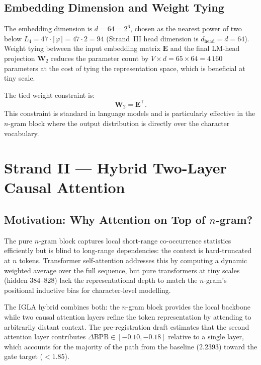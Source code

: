 \subsection{Embedding Dimension and Weight Tying}
\label{subsec:ch24-embedding}

The embedding dimension is $d = 64 = 2^6$, chosen as the nearest power of two
below $L_4 = 47 \cdot \lceil \varphi \rceil = 47 \cdot 2 = 94$ (Strand~III
head dimension is $d_{\mathrm{head}} = d = 64$).  Weight tying between the
input embedding matrix $\mathbf{E}$ and the final LM-head projection
$\mathbf{W}_2$ reduces the parameter count by $V \times d = 65 \times 64 =
4\,160$ parameters at the cost of tying the representation space, which is
beneficial at tiny scale.

The tied weight constraint is:
\begin{equation}\label{eq:ch24-weight-tie}
  \mathbf{W}_2 = \mathbf{E}^\top.
\end{equation}
This constraint is standard in language models \cite{press_using_output_embedding}
and is particularly effective in the $n$-gram block where the output distribution
is directly over the character vocabulary.

\section{Strand II --- Hybrid Two-Layer Causal Attention}
\label{sec:ch24-strand2}

\subsection{Motivation: Why Attention on Top of \texorpdfstring{$n$}{n}-gram?}
\label{subsec:ch24-hybrid-motivation}

The pure $n$-gram block captures local short-range co-occurrence statistics
efficiently but is blind to long-range dependencies: the context is hard-truncated
at $n$ tokens.  Transformer self-attention \cite{vaswani_attention} addresses this
by computing a dynamic weighted average over the full sequence, but pure
transformers at tiny scales (hidden 384--828) lack the representational depth
to match the $n$-gram's positional inductive bias for character-level modelling.

The IGLA hybrid combines both: the $n$-gram block provides the local backbone
while two causal attention layers refine the token representation by attending
to arbitrarily distant context.  The pre-registration draft
\cite{trios_gate_preregistration} estimates that the second attention layer
contributes $\Delta\mathrm{BPB} \in [-0.10, -0.18]$ relative to a single
layer, which accounts for the majority of the path from the baseline
(2.2393) toward the gate target ($< 1.85$).

